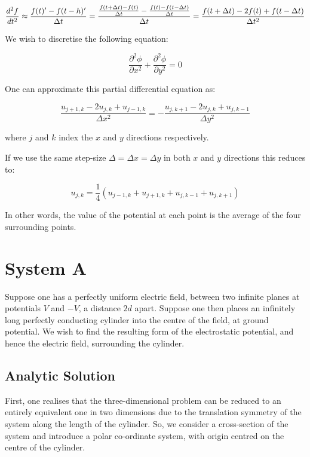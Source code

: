 \documentclass{article}
\newcommand{\be}{\begin{equation}}
\newcommand{\ee}{\end{equation}}
\begin{document}
\be
\frac{d^2 f}{dt^2} \approx \frac{f(t)' - f(t-h)'}{\Delta t} \\
= \frac{\frac{f(t +\Delta t) - f(t)}{\Delta t} - \frac{f(t) - f(t -\Delta t)}{\Delta t}}{\Delta t} \\
= \frac{f(t +\Delta t) - 2f(t) + f(t-\Delta t)}{\Delta t ^2}
\ee

We wish to discretise the following equation:

\be
\frac{\partial^2 \phi}{\partial x^2}+\frac{\partial^2 \phi}{\partial y^2} = 0
\ee

One can approximate this partial differential equation as:

\be
\frac{u_{j+1,k}-2u_{j,k}+u_{j-1,k}}{\Delta x^2} = - \frac{u_{j,k+1}-2u_{j,k}+u_{j,k-1}}{\Delta y^2}
\ee

where $j$ and $k$ index the $x$ and $y$ directions respectively.

If we use the same step-size $\Delta=\Delta x=\Delta y$ in both $x$ and $y$ directions this
reduces to:

\be
u_{j,k}= \frac{1}{4}(u_{j-1,k}+u_{j+1,k}+u_{j,k-1}+u_{j,k+1})
\ee

In other words, the value of the potential at each point is the average of
the four surrounding points.

\newpage

\section{System A}

Suppose one has a perfectly uniform electric field, between two infinite planes
at potentials $V$ and $-V$, a distance $2d$ apart. Suppose one then places an
infinitely long perfectly conducting cylinder into the centre of the field,
at ground potential. We wish to find the resulting form of the electrostatic
potential, and hence the electric field, surrounding the cylinder.

\subsection{Analytic Solution}
First, one realises that the three-dimensional problem can be reduced to an entirely
equivalent one in two dimensions due to the translation symmetry of the system along
the length of the cylinder. So, we consider a cross-section of the system and introduce
a polar co-ordinate system, with origin centred on the centre of the cylinder.
\end{document}
